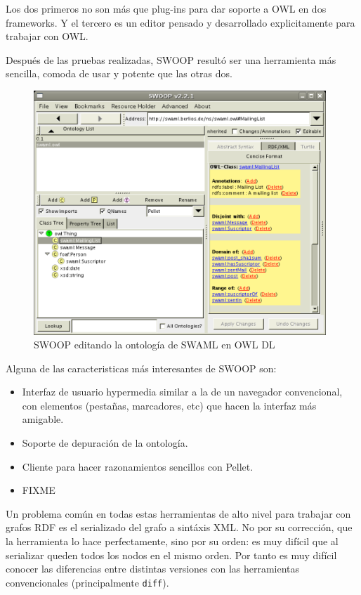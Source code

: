 Los dos primeros no son más que plug-ins para dar soporte a OWL en dos 
frameworks. Y el tercero es un editor pensado y desarrollado explicitamente
para trabajar con OWL.

Después de las pruebas realizadas, SWOOP resultó ser una herramienta más sencilla,
comoda de usar y potente que las otras dos.

\begin{figure}[ht]
	\centering
	\includegraphics[width=11cm]{images/screenshots/swoop.png}
	\caption{SWOOP editando la ontología de SWAML en OWL DL}
	\label{fig:evoWeb}
\end{figure}

Alguna de las caracteristicas más interesantes de SWOOP son:

\begin{itemize}
  \item Interfaz de usuario hypermedia similar a la de un navegador convencional, 
	con elementos (pestañas, marcadores, etc) que hacen la interfaz más 
	amigable.
  \item Soporte de depuración de la ontología.
  \item Cliente para hacer razonamientos sencillos con Pellet.
  \item FIXME
\end{itemize}

Un problema común en todas estas herramientas de alto nivel para trabajar con
grafos RDF es el serializado del grafo a sintáxis XML. No por su corrección,
que la herramienta lo hace perfectamente, sino por su orden: es muy difícil
que al serializar queden todos los nodos en el mismo orden. Por tanto es muy
difícil conocer las diferencias entre distintas versiones con las herramientas
convencionales (principalmente \texttt{diff}).

